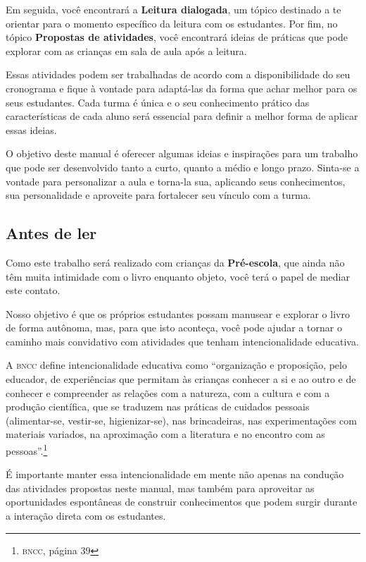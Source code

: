\documentclass[11pt]{extarticle}
\begin{document}
Em seguida, você encontrará a \textbf{Leitura dialogada}, um 
tópico destinado a te orientar para o momento específico da 
leitura com os estudantes. Por fim, no tópico 
\textbf{Propostas de atividades}, você encontrará ideias 
de práticas que pode explorar com as crianças em sala de 
aula após a leitura. 

Essas atividades podem ser trabalhadas de acordo com a 
disponibilidade do seu cronograma e fique à vontade para adaptá-las 
da forma que achar melhor para os seus estudantes. Cada turma é única 
e o seu conhecimento prático das características de cada aluno será 
essencial para definir a melhor forma de aplicar essas ideias. 

O objetivo deste manual é oferecer algumas ideias 
e inspirações para um trabalho que pode ser desenvolvido tanto 
a curto, quanto a médio e longo prazo. Sinta-se a vontade para 
personalizar a aula e torna-la sua, aplicando seus conhecimentos, sua 
personalidade e aproveite para fortalecer 
seu vínculo com a turma.


\subsection{Antes de ler}


Como este trabalho será realizado com crianças da \textbf{Pré-escola}, 
que ainda não têm muita intimidade com o livro enquanto objeto, você terá o 
papel de mediar este contato. 

Nosso objetivo é que os próprios estudantes possam manusear 
e explorar o livro de forma autônoma, mas, para que isto aconteça, você 
pode ajudar a tornar o caminho mais convidativo com atividades que tenham 
intencionalidade educativa. 

A \textsc{bncc} define intencionalidade educativa como ``organização 
e proposição, pelo educador, de experiências que permitam às crianças 
conhecer a si e ao outro e de conhecer e compreender as relações com a 
natureza, com a cultura e com a produção científica, que se traduzem nas 
práticas de cuidados pessoais (alimentar-se, vestir-se, higienizar-se), 
nas brincadeiras, nas experimentações com materiais 
variados, na aproximação com a literatura e no encontro com as 
pessoas''.\footnote{\textsc{bncc}, página 39}

É importante manter essa intencionalidade em mente não apenas na condução 
das atividades propostas neste manual, mas também para aproveitar as 
oportunidades espontâneas de construir conhecimentos que podem surgir durante 
a interação direta com os estudantes.
\end{document}
